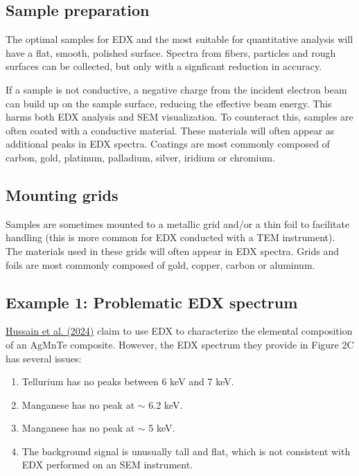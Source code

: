 \documentclass[letterpaper, 12pt]{article}
\begin{document}
\pagebreak

\subsection*{Sample preparation}

The optimal samples for EDX and the most suitable for quantitative analysis will have a flat, smooth, polished surface. Spectra from fibers, particles and rough surfaces can be collected, but only with a signficant reduction in accuracy.

If a sample is not conductive, a negative charge from the incident electron beam can build up on the sample surface, reducing the effective beam energy. This harms both EDX analysis and SEM visualization. To counteract this, samples are often coated with a conductive material. These materials will often appear as additional peaks in EDX spectra. Coatings are most commonly composed of carbon, gold, platinum, palladium, silver, iridium or chromium.

\subsection*{Mounting grids}

Samples are sometimes mounted to a metallic grid and/or a thin foil to facilitate handling (this is more common for EDX conducted with a TEM instrument). The materials used in these grids will often appear in EDX spectra. Grids and foils are most commonly composed of gold, copper, carbon or aluminum.

\pagebreak

\subsection*{Example 1: Problematic EDX spectrum}

\href{https://doi.org/10.1016/j.ijhydene.2024.05.274}{Hussain et al. (2024)} claim to use EDX to characterize the elemental composition of an AgMnTe composite. However, the EDX spectrum they provide in Figure 2C has several issues:

\begin{enumerate}
    \setlength\itemsep{-0.5em}
    \item Tellurium has no peaks between 6 keV and 7 keV.
    \item Manganese has no peak at $\sim$ 6.2 keV.
    \item Manganese has no peak at $\sim$ 5 keV.
    \item The background signal is unusually tall and flat, which is not consistent with EDX performed on an SEM instrument.
\end{enumerate}
\end{document}

